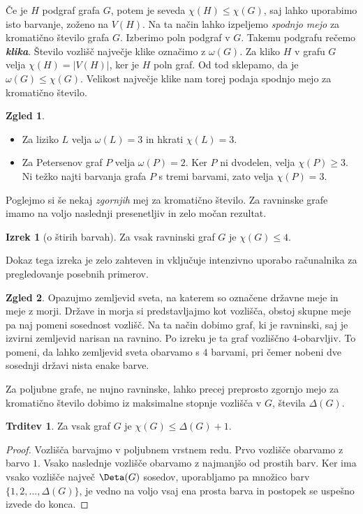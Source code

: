 \documentclass[11pt]{book}
\def\definicija{\color{rdeca}\bf\em}
\theoremstyle{definition}
\theoremstyle{zgled}
\newtheorem*{zgled}{Zgled}
\theoremstyle{odprtproblem}
\theoremstyle{domacanaloga}
\newenvironment{dokaz}
    {\color{siva}\begin{proof}}
    {\end{proof}}
\theoremstyle{izrek}
\newtheorem*{izrek}{Izrek}
\newtheorem*{trditev}{Trditev}
\begin{document}
Če je $H$ podgraf grafa $G$, potem je seveda $\chi(H) \leq \chi(G)$, saj lahko uporabimo isto barvanje, zoženo na $V(H)$. Na ta način lahko izpeljemo \emph{spodnjo mejo} za kromatično število grafa $G$. Izberimo poln podgraf v $G$. Takemu podgrafu rečemo {\definicija klika}. Število vozlišč največje klike označimo z $\omega(G)$. Za kliko $H$ v grafu $G$ velja $\chi(H) = |V(H)|$, ker je $H$ poln graf. Od tod sklepamo, da je $\omega(G) \leq \chi(G)$. Velikost največje klike nam torej podaja spodnjo mejo za kromatično število.

\begin{zgled} \leavevmode
\begin{itemize}
\item Za liziko $L$ velja $\omega(L) = 3$ in hkrati $\chi(L) = 3$.
\item Za Petersenov graf $P$ velja $\omega(P) = 2$. Ker $P$ ni dvodelen, velja $\chi(P) \geq 3$. Ni težko najti barvanja grafa $P$ s tremi barvami, zato velja $\chi(P) = 3$.
\end{itemize}
\end{zgled}

Poglejmo si še nekaj \emph{zgornjih} mej za kromatično število. Za ravninske grafe imamo na voljo naslednji presenetljiv in zelo močan rezultat.

\begin{izrek}[o štirih barvah]
Za vsak ravninski graf $G$ je $\chi(G) \leq 4$.
\end{izrek}

Dokaz tega izreka je zelo zahteven in vključuje intenzivno uporabo računalnika za pregledovanje posebnih primerov.

\begin{zgled}
Opazujmo zemljevid sveta, na katerem so označene državne meje in meje z morji. Države in morja si predstavljajmo kot vozlišča, obstoj skupne meje pa naj pomeni sosednost vozlišč. Na ta način dobimo graf, ki je ravninski, saj je izvirni zemljevid narisan na ravnino. Po izreku je ta graf vozliščno $4$-obarvljiv. To pomeni, da lahko zemljevid sveta obarvamo s $4$ barvami, pri čemer nobeni dve sosednji državi nista enake barve.
\end{zgled}

Za poljubne grafe, ne nujno ravninske, lahko precej preprosto zgornjo mejo za kromatično število dobimo iz maksimalne stopnje vozlišča v $G$, števila $\Delta(G)$.

\begin{trditev}
Za vsak graf $G$ je $\chi(G) \leq \Delta(G) + 1$.
\end{trditev}
\begin{dokaz}
Vozlišča barvajmo v poljubnem vrstnem redu. Prvo vozlišče obarvamo z barvo $1$. Vsako naslednje vozlišče obarvamo z najmanjšo od prostih barv. Ker ima vsako vozlišče največ $\Deta(G)$ sosedov, uporabljamo pa množico barv $\{ 1,2, \dots, \Delta(G) \}$, je vedno na voljo vsaj ena prosta barva in postopek se uspešno izvede do konca.
\end{dokaz}
\end{document}
